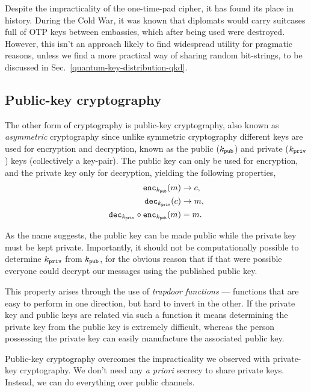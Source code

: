 Despite the impracticality of the one-time-pad cipher, it has found its place in history. During the Cold War, it was known that diplomats would carry suitcases full of OTP keys between embassies, which after being used were destroyed. However, this isn't an approach likely to find widespread utility for pragmatic reasons, unless we find a more practical way of sharing random bit-strings, to be discussed in Sec.~\ref{quantum-key-distribution-qkd}.

\subsection{Public-key cryptography} \label{public-key-cryptography}

The other form of cryptography is public-key cryptography, also known as \emph{asymmetric} cryptography since unlike symmetric cryptography different keys are used for encryption and decryption, known as the public ($k_{\tt pub}$) and private ($k_{\tt priv}$) keys (collectively a key-pair). The public key can only be used for encryption, and the private key only for decryption, yielding the following properties, 
\begin{align}
{\tt enc}_{k_{\tt pub}}(m) &\to c, \nonumber\\
{\tt dec}_{k_{\tt priv}}(c) &\to m, \nonumber\\
{\tt dec}_{k_{\tt priv}} \circ {\tt enc}_{k_{\tt pub}}(m) &= m.
\end{align}

As the name suggests, the public key can be made public while the private key must be kept private. Importantly, it should not be computationally possible to determine $k_{\tt priv}$ from $k_{\tt pub}$, for the obvious reason that if that were possible everyone could decrypt our messages using the published public key.

This property arises through the use of \emph{trapdoor functions} --- functions that are easy to perform in one direction, but hard to invert in the other. If the private key and public keys are related via such a function it means determining the private key from the public key is extremely difficult, whereas the person possessing the private key can easily manufacture the associated public key.

Public-key cryptography overcomes the impracticality we observed with private-key cryptography. We don't need any \emph{a priori} secrecy to share private keys. Instead, we can do everything over public channels.

